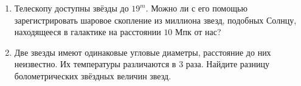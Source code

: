 \documentclass[12pt]{article}
\begin{document}
\begin{enumerate}
        \item Телескопу доступны звёзды до $19^m$. Можно ли с его помощью зарегистрировать шаровое скопление из миллиона звезд, подобных Солнцу, находящееся в галактике на расстоянии $10$ Мпк от нас?
        \item Две звезды имеют одинаковые угловые диаметры, расстояние до них неизвестно. Их температуры различаются в $3$ раза. Найдите разницу болометрических звёздных величин звезд.
 \end{enumerate}
\end{document}
